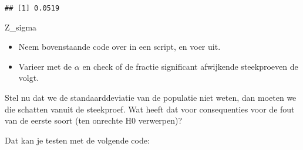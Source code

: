 \documentclass[]{book}
\newenvironment{Shaded}{\begin{snugshade}}{\end{snugshade}}
\newcommand{\KeywordTok}[1]{\textcolor[rgb]{0.13,0.29,0.53}{\textbf{{#1}}}}
\newcommand{\DataTypeTok}[1]{\textcolor[rgb]{0.13,0.29,0.53}{{#1}}}
\newcommand{\DecValTok}[1]{\textcolor[rgb]{0.00,0.00,0.81}{{#1}}}
\newcommand{\FloatTok}[1]{\textcolor[rgb]{0.00,0.00,0.81}{{#1}}}
\newcommand{\StringTok}[1]{\textcolor[rgb]{0.31,0.60,0.02}{{#1}}}
\newcommand{\CommentTok}[1]{\textcolor[rgb]{0.56,0.35,0.01}{\textit{{#1}}}}
\newcommand{\NormalTok}[1]{{#1}}
\providecommand{\tightlist}{%
  \setlength{\itemsep}{0pt}\setlength{\parskip}{0pt}}
\theoremstyle{definition}
\theoremstyle{definition}
\theoremstyle{definition}
\theoremstyle{remark}
\let\BeginKnitrBlock\begin \let\EndKnitrBlock\end
\begin{document}
\begin{Shaded}
\end{Shaded}

\begin{verbatim}
## [1] 0.0519
\end{verbatim}

\BeginKnitrBlock{exercise}
\protect\hypertarget{exr:ztoets}{}{\label{exr:ztoets} }Z\_sigma

\begin{itemize}
\tightlist
\item
  Neem bovenstaande code over in een script, en voer uit.
\item
  Varieer met de \(\alpha\) en check of de fractie significant
  afwijkende steekproeven de \alpha volgt.
\end{itemize}
\EndKnitrBlock{exercise}

Stel nu dat we de standaarddeviatie van de populatie niet weten, dan
moeten we die schatten vanuit de steekproef. Wat heeft dat voor
consequenties voor de fout van de eerste soort (ten onrechte H0
verwerpen)?

Dat kan je testen met de volgende code:
\end{document}
